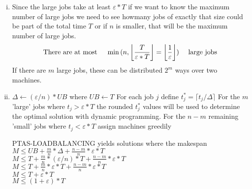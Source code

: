 \begin{enumerate}[(i)]
	\item Since the large jobs take at least $\varepsilon * T$ if we want to know the maximum number of large jobs we need to see howmany jobs of exactly that size could be part of the total time $T$ or if $n$ is smaller, that will be the maximum number of large jobs. 
\[ \text{There are at most \hspace*{10pt}} \min{(n,\left \lfloor\frac{T}{\varepsilon * T} \right \rfloor = \left \lfloor \frac{1}{\varepsilon} \right \rfloor)} \text{\hspace*{10pt} large jobs} \] 
If there are $m$ large jobs, these can be distributed $2^m$ ways over two machines.
	\item 

\begin{sourcecode}
$\Delta \leftarrow (\varepsilon / n) * UB$ where $UB \leftarrow T$ 
For each job $j$ define $t_j^* = \lceil t_j / \Delta \rceil$
For the $m$ 'large' jobs where $t_j > \varepsilon * T$ the rounded $t_j^*$ values will be used to determine the optimal solution with dynamic programming. 
For the $n-m$ remaining 'small' jobs where $t_j < \varepsilon * T$ assign machines greedily 
\qend
\end{sourcecode}

\textsc{PTAS-LOADBALANCING} yields solutions where the makespan \\
$M \leq UB + \frac{m}{n} * \Delta + \frac{n-m}{n} * \varepsilon * T$\\
$M \leq T + \frac{m}{n} * (\varepsilon / n) * T + \frac{n-m}{n} * \varepsilon * T$\\
$M \leq T + \frac{m}{n} * \varepsilon * T + \frac{n-m}{n} * \varepsilon * T$\\
$M \leq T + \varepsilon * T$\\
$M \leq (1+\varepsilon) * T$\\
\end{enumerate}
